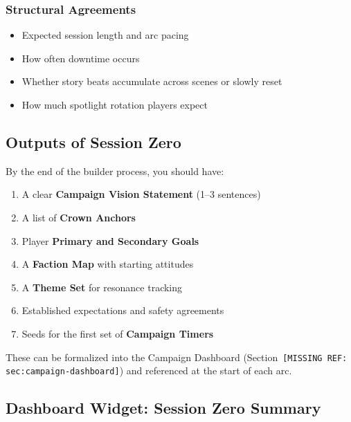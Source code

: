 \documentclass[11pt]{article}
\begin{document}
\subsubsection{Structural Agreements}
\begin{itemize}
    \item Expected session length and arc pacing
    \item How often downtime occurs
    \item Whether story beats accumulate across scenes or slowly reset
    \item How much spotlight rotation players expect
\end{itemize}

\subsection{Outputs of Session Zero}

By the end of the builder process, you should have:

\begin{enumerate}
    \item A clear \textbf{Campaign Vision Statement} (1--3 sentences)
    \item A list of \textbf{Crown Anchors}
    \item Player \textbf{Primary and Secondary Goals}
    \item A \textbf{Faction Map} with starting attitudes
    \item A \textbf{Theme Set} for resonance tracking
    \item Established expectations and safety agreements
    \item Seeds for the first set of \textbf{Campaign Timers}
\end{enumerate}

These can be formalized into the Campaign Dashboard (Section~\texttt{[MISSING REF: sec:campaign-dashboard]}) and referenced at the start of each arc.

\subsection{Dashboard Widget: Session Zero Summary}
\label{sec:dashboard-sz-widget}
\end{document}

